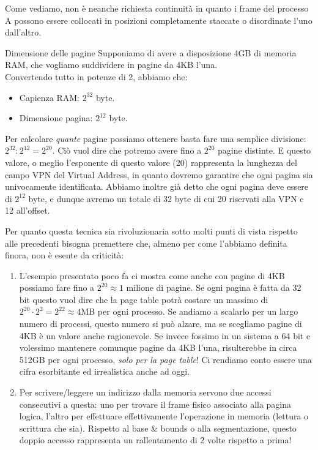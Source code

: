 \documentclass[12pt]{report}
\begin{document}
	Come vediamo, non è neanche richiesta continuità in quanto i frame del processo A possono essere collocati in posizioni completamente staccate o disordinate l'uno dall'altro.
	\begin{esempio}{Dimensione delle pagine}{}
		Supponiamo di avere a disposizione 4GB di memoria RAM, che vogliamo suddividere in pagine da 4KB l'una.\\
		Convertendo tutto in potenze di 2, abbiamo che:
		\begin{itemize}
			\item Capienza RAM: $2^32$ byte.
			
			\item Dimensione pagina: $2^12$ byte.
		\end{itemize}
		Per calcolare \textit{quante} pagine possiamo ottenere basta fare una semplice divisione: $2^{32} : 2^{12} = 2^{20}$. Ciò vuol dire che potremo avere fino a $2^{20}$ pagine distinte. E questo valore, o meglio l'esponente di questo valore (20) rappresenta la lunghezza del campo VPN del Virtual Address, in quanto dovremo garantire che ogni pagina sia univocamente identificata. Abbiamo inoltre già detto che ogni pagina deve essere di $2^{12}$ byte, e dunque avremo un totale di 32 byte di cui 20 riservati alla VPN e 12 all'offset.
	\end{esempio}
	
	Per quanto questa tecnica sia rivoluzionaria sotto molti punti di vista rispetto alle precedenti bisogna premettere che, almeno per come l'abbiamo definita finora, non è esente da criticità:
	\begin{enumerate}
		\item L'esempio presentato poco fa ci mostra come anche con pagine di 4KB possiamo fare fino a $2^{20} \approx 1$ milione di pagine. Se ogni pagina è fatta da 32 bit questo vuol dire che la page table potrà costare un massimo di $2^{20} \cdot 2^2 = 2^{22} \approx 4$MB per ogni processo. Se andiamo a scalarlo per un largo numero di processi, questo numero si può alzare, ma se scegliamo pagine di 4KB è un valore anche ragionevole. Se invece fossimo in un sistema a 64 bit e volessimo mantenere comunque pagine da 4KB l'una, risulterebbe in circa 512GB per ogni processo, \textit{solo per la page table}! Ci rendiamo conto essere una cifra esorbitante ed irrealistica anche ad oggi.
		
		\item Per scrivere/leggere un indirizzo dalla memoria servono due accessi consecutivi a questa: uno per trovare il frame fisico associato alla pagina logica, l'altro per effettuare effettivamente l'operazione in memoria (lettura o scrittura che sia). Rispetto al base \& bounds o alla segmentazione, questo doppio accesso rappresenta un rallentamento di 2 volte rispetto a prima!
	\end{enumerate}
	
\end{document}
